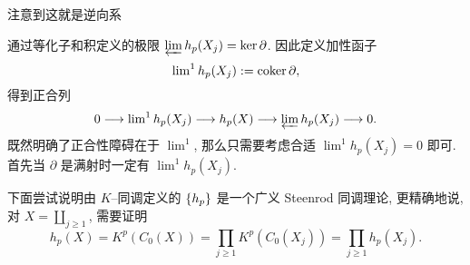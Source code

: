 注意到这就是逆向系
\begin{center}
\end{center}
通过等化子和积定义的极限 $ \varprojlim h_p(X_j)=\ker\partial $. 因此定义加性函子
\[
	\lim\nolimits^1 h_p(X_j):=\mathrm{coker}\,\partial,
\]
得到正合列
\[
	0\longrightarrow \lim\nolimits^1 h_p(X_j)\longrightarrow h_p(X)\longrightarrow \varprojlim h_p(X_j)\longrightarrow 0.
\]
既然明确了正合性障碍在于 $ \lim^1 $, 那么只需要考虑合适 $ \lim^1 h_p(X_j)=0 $ 即可. 首先当 $ \partial $ 是满射时一定有 $ \lim^1 h_p(X_j) $.

下面尝试说明由 $ K $--同调定义的 $ \left\{ h_p \right\} $ 是一个广义 Steenrod 同调理论, 更精确地说, 对 $ X=\coprod_{j\geqslant 1} $, 需要证明
\[
	h_p(X)=K^p(C_0(X))=\prod_{j\geqslant 1}K^p(C_0(X_j))=\prod_{j\geqslant 1}h_p(X_j).
\]

